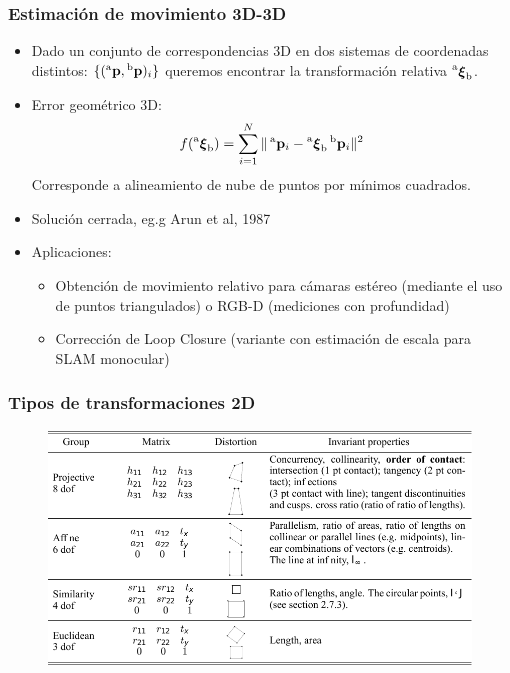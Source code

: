 \begin{frame}
    \frametitle{Estimación de movimiento 3D-3D}
    \footnotesize
    
    \begin{itemize}
        \item Dado un conjunto de correspondencias 3D en dos sistemas de coordenadas distintos: $\{(\prescript{\mathrm{a}}{}{\boldsymbol{\mathbf{p}}}, \prescript{\mathrm{b}}{}{\boldsymbol{\mathbf{p}}})_{i}\}$ queremos encontrar la transformación relativa $\prescript{\mathrm{a}}{}{{\boldsymbol{\mathbf{\xi}}}_\mathrm{b}}$.
        \item Error geométrico 3D:
        \[
        f(\prescript{\mathrm{a}}{}{{\boldsymbol{\mathbf{\xi}}}_\mathrm{b}})= \sum_{i=1}^{N} \Vert \prescript{\mathrm{a}}{}{\boldsymbol{\mathbf{p}}}_{i} - \prescript{\mathrm{a}}{}{{\boldsymbol{\mathbf{\xi}}}_\mathrm{b}} \prescript{\mathrm{b}}{}{\boldsymbol{\mathbf{p}}}_{i} \Vert^{2}
        \]
        Corresponde a alineamiento de nube de puntos por mínimos cuadrados.
        \item Solución cerrada, eg.g Arun et al, 1987
        \item Aplicaciones:
        \begin{itemize}
            \item Obtención de movimiento relativo para cámaras estéreo (mediante el uso de puntos triangulados) o RGB-D (mediciones con profundidad)
            \item Corrección de Loop Closure (variante con estimación de escala para SLAM monocular)
        \end{itemize}
    \end{itemize}
    
\end{frame}

\begin{frame}
    \frametitle{Tipos de transformaciones 2D}
    \footnotesize
    
    \begin{figure}
        \includegraphics[width=0.9\columnwidth]{./images/transformation_table_2d.pdf}
    \end{figure}
    
\end{frame}

